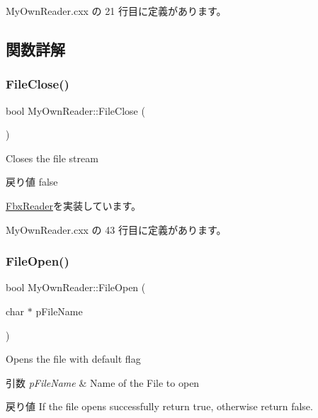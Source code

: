  My\+Own\+Reader.\+cxx の 21 行目に定義があります。



\subsection{関数詳解}
\mbox{\label{class_my_own_reader_abc7f3b49b51e2e59e502e774c78443d8}} 
\subsubsection{\texorpdfstring{File\+Close()}{FileClose()}}
{\footnotesize\ttfamily bool My\+Own\+Reader\+::\+File\+Close (\begin{DoxyParamCaption}{ }\end{DoxyParamCaption})\hspace{0.3cm}{\ttfamily [virtual]}}

Closes the file stream \begin{DoxyReturn}{戻り値}
{\ttfamily false} 
\end{DoxyReturn}


\hyperlink{class_fbx_reader_a327df94e5c24315fc5cbcedf0e7bb615}{Fbx\+Reader}を実装しています。



 My\+Own\+Reader.\+cxx の 43 行目に定義があります。

\mbox{\label{class_my_own_reader_a77f7f753ea30442895994a0f6c0479d8}} 
\subsubsection{\texorpdfstring{File\+Open()}{FileOpen()}}
{\footnotesize\ttfamily bool My\+Own\+Reader\+::\+File\+Open (\begin{DoxyParamCaption}\item[{char $\ast$}]{p\+File\+Name }\end{DoxyParamCaption})\hspace{0.3cm}{\ttfamily [virtual]}}

Opens the file with default flag 
\begin{DoxyParams}{引数}
{\em p\+File\+Name} & Name of the File to open \\
\hline
\end{DoxyParams}
\begin{DoxyReturn}{戻り値}
If the file opens successfully return {\ttfamily true}, otherwise return {\ttfamily false}. 
\end{DoxyReturn}



